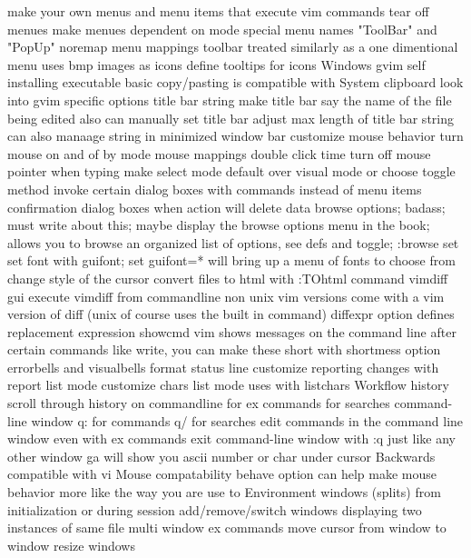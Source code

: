 \documentclass[12pt]{book}
\begin{document}
{{      make your own menus and menu items that execute vim commands
      tear off menues
      make menues dependent on mode
      special menu names "ToolBar" and "PopUp"
      noremap menu mappings
    toolbar
      treated similarly as a one dimentional menu
      uses bmp images as icons
      define tooltips for icons
    Windows gvim
      self installing executable
      basic copy/pasting is compatible with System clipboard
    look into gvim specific options
    title bar string
      make title bar say the name of the file being edited
      also can manually set title bar
      adjust max length of title bar string
      can also manaage string in minimized window bar
    customize mouse behavior
      turn mouse on and of by mode
      mouse mappings
      double click time
      turn off mouse pointer when typing
    make select mode default over visual mode or choose toggle method
    invoke certain dialog boxes with commands instead of menu items
    confirmation dialog boxes when action will delete data
    browse options; badass; must write about this; maybe display the browse options menu in the book; allows you to browse an organized list of options, see defs and toggle; :browse set
    set font with guifont; set guifont=* will bring up a menu of fonts to choose from
    change style of the cursor
  convert files to html with :TOhtml command
  vimdiff gui
    execute vimdiff from commandline
    non unix vim versions come with a vim version of diff (unix of course uses the built in command)
    diffexpr option defines replacement expression
  showcmd
  vim shows messages on the command line after certain commands like write, you can make these short with shortmess option
  errorbells and visualbells
  format status line
    customize reporting changes with report
  list mode
    customize chars list mode uses with listchars
Workflow
  history
    scroll through history on commandline
      for ex commands
      for searches
    command-line window
      q: for commands
      q/ for searches
      edit commands in the command line window even with ex commands
      exit command-line window with :q just like any other window
  ga will show you ascii number or char under cursor
  Backwards compatible with vi
  Mouse compatability
    behave option can help make mouse behavior more like the way you are use to
  Environment
    windows (splits)
      from initialization or during session
      add/remove/switch windows
      displaying two instances of same file
      multi window ex commands
      move cursor from window to window
      resize windows
}}
\end{document}
